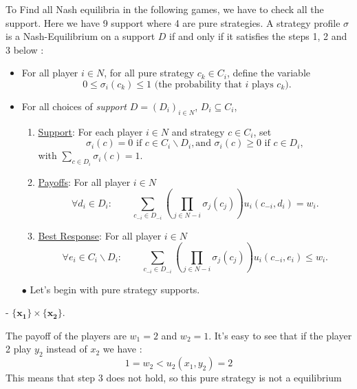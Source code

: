 To Find all Nash equilibria in the following games, we have to check all the support. Here we have 9 support where 4 are pure strategies. A strategy profile $\sigma$ is a Nash-Equilibrium on a support $D$ if and only if it satisfies the steps 1, 2 and 3 below :

\begin{procedure}
\begin{itemize}
\item For all player $i \in N$, for all pure strategy $c_k \in C_i$, define the variable 
$$ 0 \leq \sigma_i(c_k) \leq 1 \text{ (the probability that $i$ plays $c_k$)}.$$ 
\item For all choices of \emph{support} $D = (D_i)_{i \in N}$, $D_i \subseteq C_i$, 
\begin{enumerate}
\item \underline{Support}:
 For each player $i \in N$ and strategy $c \in C_i$, set
$$ \sigma_i(c) = 0 \text{ if $c \in C_i \backslash D_i$}, \text{and } \sigma_i(c) \geq 0 \text{ if $c \in D_i$},$$
with $ \sum_{c \in D_i} \sigma_i(c) = 1$. 
\label{chap3:prc2:support}
\item \underline{Payoffs}: For all player $i \in N$
$$ \forall d_i \in D_i:  \qquad  \sum_{c_{-i} \in D_{-i}} \left  ( \prod_{j \in N-i} \sigma_j(c_j) \right ) u_i(c_{-i}, d_i) = w_i.  $$
\label{chap3:prc2:equ}
\item \underline{Best Response}:  For all player $i \in N$
$$ \forall e_i \in C_i \backslash D_i:  \qquad \sum_{c_{-i} \in D_{-i}} \left  ( \prod_{j \in N-i} \sigma_j(c_j) \right ) u_i(c_{-i}, e_i) \leq w_i. $$
 \label{chap3:prc2:domi}
\end{enumerate}
\end{itemize}
\label{chap3:proc:computeNash}
\end{procedure}



\begin{itemize}
  \item[$\bullet$] Let's begin with pure strategy supports. 
\end{itemize}

- $\mathbf{\{x_1\}}\times\mathbf{\{x_2\}}$.

The payoff of the players are $w_1=2$ and $w_2=1$. It's easy to see that if the player 2 play $y_2$ instead of $x_2$ we have :
\begin{equation*}
    1=w_2<u_2(x_1,y_2)=2
\end{equation*}
This means that step 3 does not hold, so this pure strategy is not a equilibrium 

